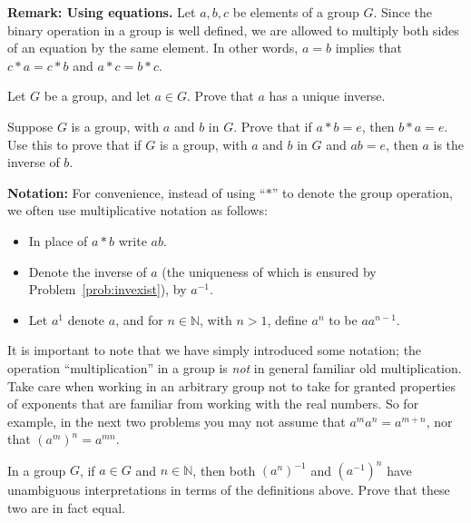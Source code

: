 \noindent\textbf{Remark: Using equations.} Let \(a, b, c\) be elements of a group \(G\). Since the binary operation in a group is well defined, we are allowed to multiply both sides of an equation by the same element. In other words, \(a = b\) implies that \( c * a = c * b\) and \(a * c = b * c\).

\begin{problem}\label{prob:invexist}
Let \(G\) be a group, and let \(a \in G\). Prove that \(a\) has a unique inverse.
\begin{annotation}
\end{annotation}
\end{problem}

\begin{problem}
Suppose \(G\) is a group, with \(a\) and \(b\) in \(G\). Prove that if \(a * b = e\), then \(b * a = e\). Use this to prove that if \(G\) is a group, with \(a\) and \(b\) in \(G\) and \(ab = e\), then \(a\) is the inverse of \(b\).
\end{problem}

\noindent\textbf{Notation:} For convenience, instead of using ``\(*\)'' to denote the group operation, we often use multiplicative notation as follows:
\begin{itemize}[itemsep=0pt, topsep=3pt]
  \item In place of \(a * b\) write \(ab\).
  \item Denote the inverse of \(a\) (the uniqueness of which is ensured by Problem~\ref{prob:invexist}), by \(a^{-1}\).
  \item Let \(a^1\) denote \(a\), and for \(n \in \mathbb{N}\), with \(n > 1\), define \(a^n\) to be \(aa^{n-1}\).
\end{itemize}

It is important to note that we have simply introduced some notation; the operation ``multiplication'' in a group is \textit{not} in general familiar old multiplication. Take care when working in an arbitrary group not to take for granted properties of exponents that are familiar from working with the real numbers. So for example, in the next two problems you may not assume that \(a^ma^n = a^{m+n}\), nor that \((a^m)^n = a^{mn}\).

\begin{problem}\label{prob:powinv}
In a group \(G\), if \(a \in G\) and \(n \in \mathbb{N}\), then both \( (a^n)^{-1}\) and \((a^{-1})^n\) have unambiguous interpretations in terms of the definitions above. Prove that these two are in fact equal.
\end{problem}


